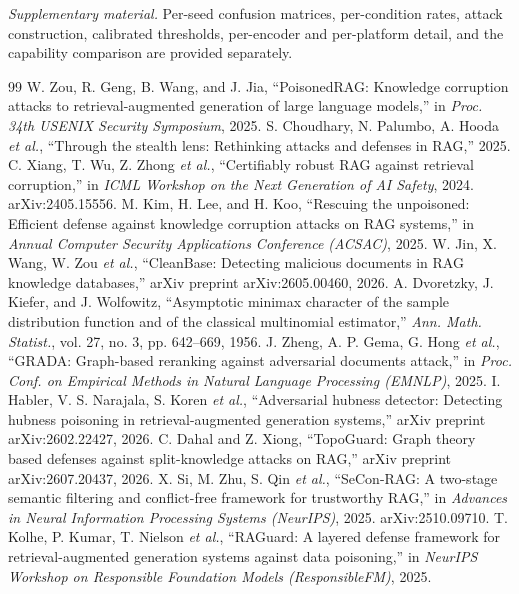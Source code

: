 \documentclass[conference]{IEEEtran}
\begin{document}
\noindent\emph{Supplementary material.} Per-seed confusion matrices, per-condition rates,
attack construction, calibrated thresholds, per-encoder and per-platform detail, and the
capability comparison are provided separately.


\begin{thebibliography}{99}
 W. Zou, R. Geng, B. Wang, and J. Jia, ``PoisonedRAG: Knowledge corruption attacks to retrieval-augmented generation of large language models,'' in \emph{Proc. 34th USENIX Security Symposium}, 2025.
 S. Choudhary, N. Palumbo, A. Hooda \emph{et al.}, ``Through the stealth lens: Rethinking attacks and defenses in RAG,'' 2025.
 C. Xiang, T. Wu, Z. Zhong \emph{et al.}, ``Certifiably robust RAG against retrieval corruption,'' in \emph{ICML Workshop on the Next Generation of AI Safety}, 2024. arXiv:2405.15556.
 M. Kim, H. Lee, and H. Koo, ``Rescuing the unpoisoned: Efficient defense against knowledge corruption attacks on RAG systems,'' in \emph{Annual Computer Security Applications Conference (ACSAC)}, 2025.
 W. Jin, X. Wang, W. Zou \emph{et al.}, ``CleanBase: Detecting malicious documents in RAG knowledge databases,'' arXiv preprint arXiv:2605.00460, 2026.
 A. Dvoretzky, J. Kiefer, and J. Wolfowitz, ``Asymptotic minimax character of the sample distribution function and of the classical multinomial estimator,'' \emph{Ann. Math. Statist.}, vol. 27, no. 3, pp. 642--669, 1956.
 J. Zheng, A. P. Gema, G. Hong \emph{et al.}, ``GRADA: Graph-based reranking against adversarial documents attack,'' in \emph{Proc. Conf. on Empirical Methods in Natural Language Processing (EMNLP)}, 2025.
 I. Habler, V. S. Narajala, S. Koren \emph{et al.}, ``Adversarial hubness detector: Detecting hubness poisoning in retrieval-augmented generation systems,'' arXiv preprint arXiv:2602.22427, 2026.
 C. Dahal and Z. Xiong, ``TopoGuard: Graph theory based defenses against split-knowledge attacks on RAG,'' arXiv preprint arXiv:2607.20437, 2026.
 X. Si, M. Zhu, S. Qin \emph{et al.}, ``SeCon-RAG: A two-stage semantic filtering and conflict-free framework for trustworthy RAG,'' in \emph{Advances in Neural Information Processing Systems (NeurIPS)}, 2025. arXiv:2510.09710.
 T. Kolhe, P. Kumar, T. Nielson \emph{et al.}, ``RAGuard: A layered defense framework for retrieval-augmented generation systems against data poisoning,'' in \emph{NeurIPS Workshop on Responsible Foundation Models (ResponsibleFM)}, 2025.

\end{thebibliography}
\end{document}
